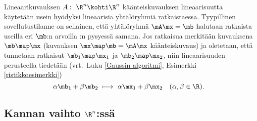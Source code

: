 Lineaarikuvauksen $A:\ \R^n \kohti \R^n$ käänteiskuvauksen lineaarisuutta käytetään usein
hyödyksi lineaarisia yhtälöryhmiä ratkaistaessa. Tyypillinen sovellutustilanne on sellainen,
että yhtälöryhmä $\mA\mx = \mb$ halutaan ratkaista useilla eri $\mb$:n arvoilla \mA:n pysyessä 
samana. Jos ratkaisua merkitään kuvauksena $\mb \map \mx$ (kuvauksen $\mx\map\mb=\mA\mx$ 
käänteiskuvaus) ja oletetaan, että tunnetaan ratkaisut $\mb_1 \map \mx_1$ ja 
$\mb_2 \map \mx_2$, niin lineaarisuuden perusteella tiedetään 
(vrt.\ Luku \ref{Gaussin algoritmi}, Esimerkki \ref{ristikkoesimerkki})
\[ 
\alpha \mb_1 + \beta \mb_2\ \longmapsto\ \alpha \mx_1 + \beta \mx_2 \quad (\alpha,\beta \in \R). 
\]

\subsection*{Kannan vaihto $\R^n$:ssä}

